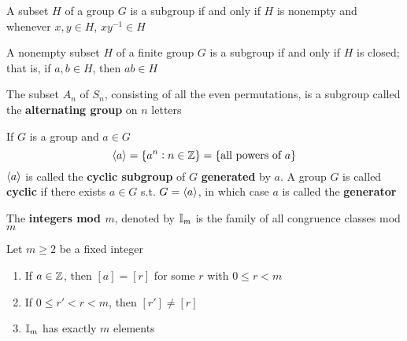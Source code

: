 \documentclass[11pt]{article}
\begin{document}
\begin{proposition}[]
A subset \(H\) of a group \(G\) is a subgroup if and only if \(H\) is nonempty and
whenever \(x,y\in H\), \(xy^{-1}\in H\)
\end{proposition}

\begin{proposition}[]
A nonempty subset \(H\) of a finite group \(G\) is a subgroup if and only if \(H\)
is closed; that is, if \(a,b\in H\), then \(ab\in H\)
\end{proposition}

\begin{examplle}[]
The subset \(A_n\) of \(S_n\), consisting of all the even permutations, is a
subgroup called the \textbf{alternating group} on \(n\) letters
\end{examplle}

\begin{definition}[]
If \(G\) is a group and \(a\in G\)
\begin{equation*}
\langle a\rangle=\{a^n:n\in\mathbb{Z}\}=\{\text{all powers of } a\}
\end{equation*}
\(\langle a\rangle\) is called the \textbf{cyclic subgroup} of \(G\) \textbf{generated} by \(a\). A
group \(G\) is called \textbf{cyclic} if there exists \(a\in G\) s.t. \(G=\langle a\rangle\),
in which case \(a\) is called the \textbf{generator}
\end{definition}

\begin{definition}[]
The \textbf{integers mod \(m\)}, denoted by \(\mathbb{I}_m\) is the family of all congruence
classes mod \(m\)
\end{definition}


\begin{proposition}[]
Let \(m\ge 2\) be a fixed integer
\begin{enumerate}
\item If \(a\in \mathbb{Z}\), then \([a]=[r]\) for some \(r\) with \(0\le r<m\)
\item If \(0\le r'<r<m\), then \([r']\neq[r]\)
\item \(\mathbb{I}_m\) has exactly \(m\) elements
\end{enumerate}
\end{proposition}
\end{document}
